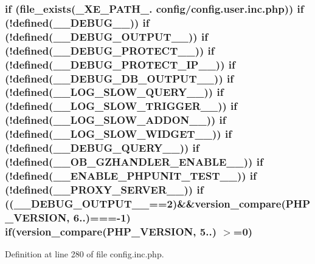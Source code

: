 \subsubsection[{if}]{\setlength{\rightskip}{0pt plus 5cm}if (file\+\_\+exists(\+\_\+\+X\+E\+\_\+\+P\+A\+T\+H\+\_\+. \textquotesingle{}config/config.\+user.\+inc.\+php\textquotesingle{})) if (!defined(\textquotesingle{}\+\_\+\+\_\+\+D\+E\+B\+U\+G\+\_\+\+\_\+\textquotesingle{})) if (!defined(\textquotesingle{}\+\_\+\+\_\+\+D\+E\+B\+U\+G\+\_\+\+O\+U\+T\+P\+U\+T\+\_\+\+\_\+\textquotesingle{})) if (!defined(\textquotesingle{}\+\_\+\+\_\+\+D\+E\+B\+U\+G\+\_\+\+P\+R\+O\+T\+E\+C\+T\+\_\+\+\_\+\textquotesingle{})) if (!defined(\textquotesingle{}\+\_\+\+\_\+\+D\+E\+B\+U\+G\+\_\+\+P\+R\+O\+T\+E\+C\+T\+\_\+\+I\+P\+\_\+\+\_\+\textquotesingle{})) if (!defined(\textquotesingle{}\+\_\+\+\_\+\+D\+E\+B\+U\+G\+\_\+\+D\+B\+\_\+\+O\+U\+T\+P\+U\+T\+\_\+\+\_\+\textquotesingle{})) if (!defined(\textquotesingle{}\+\_\+\+\_\+\+L\+O\+G\+\_\+\+S\+L\+O\+W\+\_\+\+Q\+U\+E\+R\+Y\+\_\+\+\_\+\textquotesingle{})) if (!defined(\textquotesingle{}\+\_\+\+\_\+\+L\+O\+G\+\_\+\+S\+L\+O\+W\+\_\+\+T\+R\+I\+G\+G\+E\+R\+\_\+\+\_\+\textquotesingle{})) if (!defined(\textquotesingle{}\+\_\+\+\_\+\+L\+O\+G\+\_\+\+S\+L\+O\+W\+\_\+\+A\+D\+D\+O\+N\+\_\+\+\_\+\textquotesingle{})) if (!defined(\textquotesingle{}\+\_\+\+\_\+\+L\+O\+G\+\_\+\+S\+L\+O\+W\+\_\+\+W\+I\+D\+G\+E\+T\+\_\+\+\_\+\textquotesingle{})) if (!defined(\textquotesingle{}\+\_\+\+\_\+\+D\+E\+B\+U\+G\+\_\+\+Q\+U\+E\+R\+Y\+\_\+\+\_\+\textquotesingle{})) if (!defined(\textquotesingle{}\+\_\+\+\_\+\+O\+B\+\_\+\+G\+Z\+H\+A\+N\+D\+L\+E\+R\+\_\+\+E\+N\+A\+B\+L\+E\+\_\+\+\_\+\textquotesingle{})) if (!defined(\textquotesingle{}\+\_\+\+\_\+\+E\+N\+A\+B\+L\+E\+\_\+\+P\+H\+P\+U\+N\+I\+T\+\_\+\+T\+E\+S\+T\+\_\+\+\_\+\textquotesingle{})) if (!defined(\textquotesingle{}\+\_\+\+\_\+\+P\+R\+O\+X\+Y\+\_\+\+S\+E\+R\+V\+E\+R\+\_\+\+\_\+\textquotesingle{})) if ((\+\_\+\+\_\+\+D\+E\+B\+U\+G\+\_\+\+O\+U\+T\+P\+U\+T\+\_\+\+\_\+==2)\&\&version\+\_\+compare(P\+H\+P\+\_\+\+V\+E\+R\+S\+I\+O\+N, \textquotesingle{}6..\textquotesingle{})===-\/1) if(version\+\_\+compare(P\+H\+P\+\_\+\+V\+E\+R\+S\+I\+O\+N, \textquotesingle{}5..\textquotesingle{}) $>$=0)}\label{config_8inc_8php_ac202e21c80d0f28d495d074d3c23e1ca}


Definition at line 280 of file config.\+inc.\+php.

